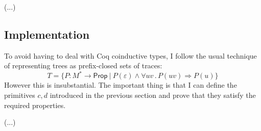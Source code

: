 \documentclass[11pt]{article}
\newcommand{\kw}[1]{{\mathsf{#1}}}
\begin{document}
(...)

\subsection{Implementation}

To avoid having to deal with Coq coinductive types,
I follow the usual technique of representing trees as
prefix-closed sets of traces:
\[
  T = \{ P : M^* \rightarrow \kw{Prop} \ \vert\ 
    P(\varepsilon) \wedge
    \forall u v \,.\, P(u v) \Rightarrow P(u) \}
\]
However this is insubstantial.
The important thing is that I can define the primitives $c, d$
introduced in the previous section and prove that they
satisfy the required properties.

(...)
\end{document}
